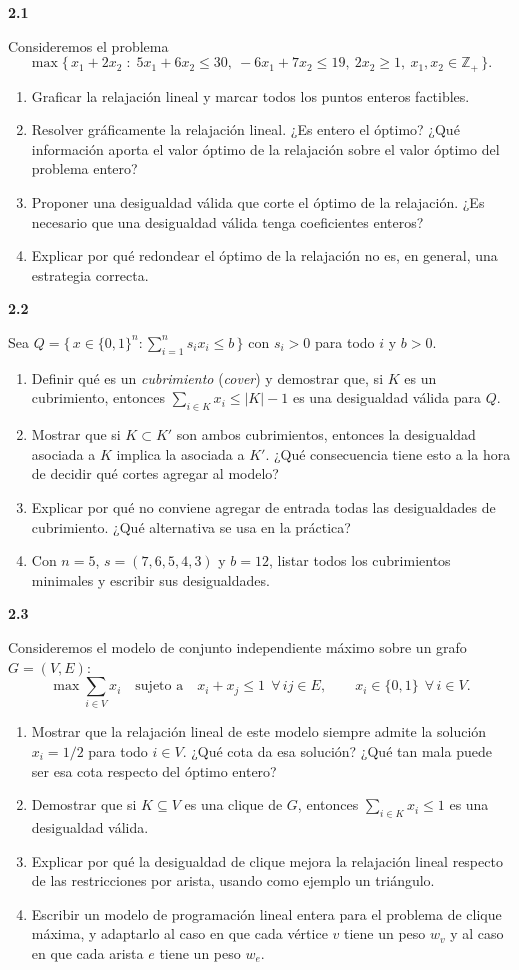 \documentclass[11pt,a4paper]{article}
\newcommand{\ejercicio}[1]{\par\medskip\noindent\textbf{#1}\par\nopagebreak\smallskip}
\newcommand{\Z}{\mathbb{Z}}
\begin{document}
\ejercicio{2.1}
Consideremos el problema
\[
\max \{\, x_1 + 2x_2 \;:\; 5x_1 + 6x_2 \le 30,\ -6x_1 + 7x_2 \le 19,\
2x_2 \ge 1,\ x_1, x_2 \in \Z_+ \,\}.
\]
\begin{enumerate}
  \item Graficar la relajación lineal y marcar todos los puntos enteros
  factibles.
  \item Resolver gráficamente la relajación lineal. ¿Es entero el óptimo?
  ¿Qué información aporta el valor óptimo de la relajación sobre el valor
  óptimo del problema entero?
  \item Proponer una desigualdad válida que corte el óptimo de la relajación.
  ¿Es necesario que una desigualdad válida tenga coeficientes enteros?
  \item Explicar por qué redondear el óptimo de la relajación no es, en general,
  una estrategia correcta.
\end{enumerate}

\ejercicio{2.2}
Sea $Q = \{\, x \in \{0,1\}^n : \sum_{i=1}^{n} s_i x_i \le b \,\}$ con
$s_i > 0$ para todo $i$ y $b > 0$.
\begin{enumerate}
  \item Definir qué es un \emph{cubrimiento} (\emph{cover}) y demostrar que, si
  $K$ es un cubrimiento, entonces $\sum_{i \in K} x_i \le |K| - 1$ es una
  desigualdad válida para $Q$.
  \item Mostrar que si $K \subset K'$ son ambos cubrimientos, entonces la
  desigualdad asociada a $K$ implica la asociada a $K'$. ¿Qué consecuencia tiene
  esto a la hora de decidir qué cortes agregar al modelo?
  \item Explicar por qué no conviene agregar de entrada todas las desigualdades
  de cubrimiento. ¿Qué alternativa se usa en la práctica?
  \item Con $n = 5$, $s = (7, 6, 5, 4, 3)$ y $b = 12$, listar todos los
  cubrimientos minimales y escribir sus desigualdades.
\end{enumerate}

\ejercicio{2.3}
Consideremos el modelo de conjunto independiente máximo sobre un grafo
$G = (V,E)$:
\[
\max \sum_{i \in V} x_i \quad \text{sujeto a} \quad x_i + x_j \le 1 \ \
\forall\, ij \in E, \qquad x_i \in \{0,1\} \ \ \forall\, i \in V .
\]
\begin{enumerate}
  \item Mostrar que la relajación lineal de este modelo siempre admite la
  solución $x_i = 1/2$ para todo $i \in V$. ¿Qué cota da esa solución? ¿Qué tan
  mala puede ser esa cota respecto del óptimo entero?
  \item Demostrar que si $K \subseteq V$ es una clique de $G$, entonces
  $\sum_{i \in K} x_i \le 1$ es una desigualdad válida.
  \item Explicar por qué la desigualdad de clique mejora la relajación lineal
  respecto de las restricciones por arista, usando como ejemplo un triángulo.
  \item Escribir un modelo de programación lineal entera para el problema de
  clique máxima, y adaptarlo al caso en que cada vértice $v$ tiene un peso
  $w_v$ y al caso en que cada arista $e$ tiene un peso $w_e$.
\end{enumerate}
\end{document}
